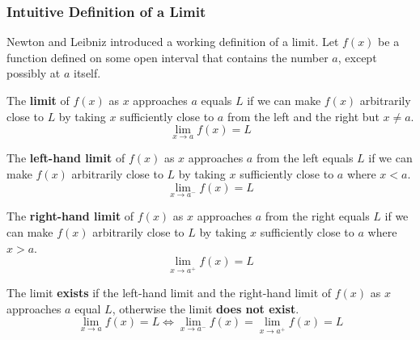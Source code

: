 \subsubsection{Intuitive Definition of a Limit}
Newton and Leibniz introduced a working definition of a limit.
Let \(f(x)\) be a function defined on some open interval that contains the
number \(a\), except possibly at \(a\) itself.
\begin{definition}
    The \textbf{limit} of \(f(x)\) as \(x\) approaches \(a\) equals \(L\) if
    we can make \(f(x)\) arbitrarily close to \(L\) by taking \(x\)
    sufficiently close to \(a\) from the left and the right but \(x\neq a\).
    \[\lim_{x\to a}f(x)=L\]
\end{definition}
\begin{definition}
    The \textbf{left-hand limit} of \(f(x)\) as \(x\) approaches \(a\) from
    the left equals \(L\) if we can make \(f(x)\) arbitrarily close to \(L\)
    by taking \(x\) sufficiently close to \(a\) where \(x<a\).
    \[\lim_{x\to a^-}f(x)=L\]
\end{definition}
\begin{definition}
    The \textbf{right-hand limit} of \(f(x)\) as \(x\) approaches \(a\) from
    the right equals \(L\) if we can make \(f(x)\) arbitrarily close to \(L\)
    by taking \(x\) sufficiently close to \(a\) where \(x>a\).
    \[\lim_{x\to a^+}f(x)=L\]
\end{definition}
The limit \textbf{exists} if the left-hand limit and the right-hand limit of
\(f(x)\) as \(x\) approaches \(a\) equal \(L\), otherwise the limit
\textbf{does not exist}.
\[\lim_{x\to a}f(x)=L \iff \lim_{x\to a^-}f(x) = \lim_{x\to a^+}f(x)=L\]